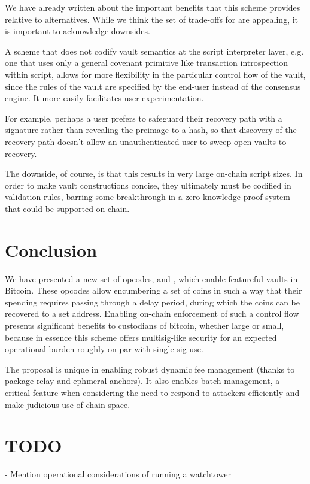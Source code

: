 \documentclass[10pt]{article}
\begin{document}
We have already written about the important benefits that this scheme provides relative
to alternatives. While we think the set of trade-offs for \opv{} are
appealing, it is important to acknowledge downsides.

A scheme that does not codify vault semantics at the script interpreter layer, e.g. one
that uses only a general covenant primitive like transaction introspection within
script, allows for more flexibility in the particular control flow of the vault, since
the rules of the vault are specified by the end-user instead of the consensus engine.
It more easily facilitates user experimentation.

For example, perhaps a user prefers to safeguard their recovery path with a
signature rather than revealing the preimage to a \spk{} hash, so that discovery of the
recovery path doesn't allow an unauthenticated user to sweep open vaults to recovery.

The downside, of course, is that this results in very large on-chain script sizes. In
order to make vault constructions concise, they ultimately must be codified in
validation rules, barring some breakthrough in a zero-knowledge proof system that could
be supported on-chain.

\section*{Conclusion}

We have presented a new set of opcodes, \opv{} and \opuv{}, which enable featureful
vaults in Bitcoin. These opcodes allow encumbering a set of coins in such a way that
their spending requires passing through a delay period, during which the coins can be
recovered to a set address. Enabling on-chain enforcement of such a control flow
presents significant benefits to custodians of bitcoin, whether large or small, because
in essence this scheme offers multisig-like security for an expected operational burden roughly
on par with single sig use.

The \opv{} proposal is unique in enabling robust dynamic fee management (thanks to
package relay and ephmeral anchors). It also enables batch management, a
critical feature when considering the need to respond to attackers efficiently and make
judicious use of chain space.


\section*{TODO}

- Mention operational considerations of running a watchtower

\printbibliography
\end{document}
